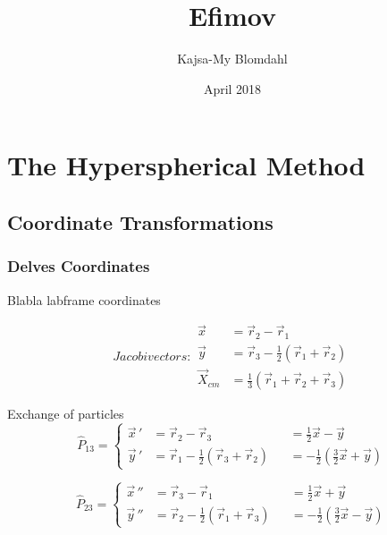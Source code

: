\documentclass{article}
\title{Efimov}
\author{Kajsa-My Blomdahl}
\date{April 2018}
\begin{document}
\maketitle

\section{The Hyperspherical Method}

\subsection{Coordinate Transformations}
\subsubsection{Delves Coordinates}

Blabla labframe coordinates

\begin{subequations} \label{eq:1}
Jacobi vectors:
\begin{align}
        \vec{x} 		&= \vec{r}_2 - \vec{r}_1\\
        \vec{y} 		&= \vec{r}_3 - \frac{1}{2}(\vec{r}_1 + \vec{r}_2)\\
        \vec{X}_{cm} 	&= \frac{1}{3} (\vec{r}_1 + \vec{r}_2 + \vec{r}_3)
\end{align}
\end{subequations}

Exchange of particles
\begin{equation}
\hat{P}_{13} = \left \{ \begin{aligned}
        \vec{x} \, ' &= \vec{r}_2 - \vec{r}_3 &&= \frac{1}{2}\vec{x} - \vec{y} \\
        \vec{y} \, ' &= \vec{r}_1 - \frac{1}{2}(\vec{r}_3 + \vec{r}_2) &&= -\frac{1}{2} (\frac{3}{2} \vec{x} + \vec{y})
       \end{aligned}
 \right.
 \end{equation}
 
\begin{equation}
\hat{P}_{23} = \left \{ \begin{aligned}
        \vec{x} \, '' &= \vec{r}_3 - \vec{r}_1 &&= \frac{1}{2}\vec{x} + \vec{y} \\
        \vec{y} \, '' &= \vec{r}_2 - \frac{1}{2}(\vec{r}_1 + \vec{r}_3) &&= -\frac{1}{2} (\frac{3}{2} \vec{x} - \vec{y})
       \end{aligned}
 \right.
 \end{equation}
\end{document}
